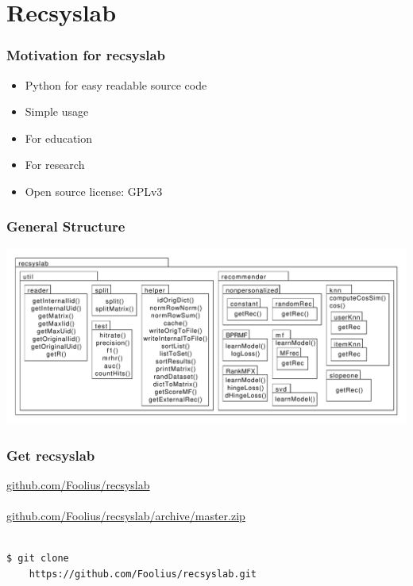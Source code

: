 \documentclass[mathserif,svgnames]{beamer}
\begin{document}
\section{Recsyslab}
\begin{frame} 
\frametitle{Motivation for recsyslab} %
\begin{itemize}
    \item Python for easy readable source code
    \item Simple usage
    \item For education
    \item For research
    \item Open source license: GPLv3
\end{itemize}
\end{frame}
\begin{frame}
\frametitle{General Structure}
\begin{center}
    \includegraphics[page=1, scale=0.3]{packagediagram.pdf}
\end{center}
\end{frame}
\begin{frame}[fragile]
    \frametitle{Get recsyslab}
    \url{github.com/Foolius/recsyslab}\\
    \hspace*{8cm}\\
    \url{github.com/Foolius/recsyslab/archive/master.zip}\\
    \hspace*{8cm}\\
    \begin{lstlisting}[style=pseudocode]
$ git clone 
    https://github.com/Foolius/recsyslab.git
    \end{lstlisting}
\end{frame}
\end{document}
